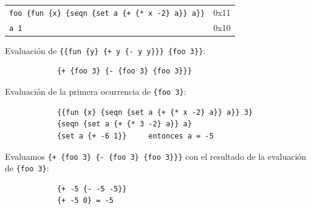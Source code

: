 \documentclass[letterpaper,11pt]{article}
\begin{document}
\begin{enumerate}
\begin{itemize}
\begin{center}
\begin{tabular}{|l| c }
                \texttt{foo \hspace{1cm} \{fun \{x\} \{seqn \{set a \{+ \{* x -2\} a\}\} a\}\}} & 0x11\\\cline{1-1}
                \texttt{a \hspace{1.4cm} 1} & 0x10\\\cline{1-1}
            \end{tabular}
        \end{center}
        Evaluación de \texttt{\{\{fun \{y\} \{+ y \{- y y\}\}\} \{foo 3\}\}}:
        \begin{verbatim}
            {+ {foo 3} {- {foo 3} {foo 3}}}
        \end{verbatim}
        Evaluación de la primera ocurrencia de \texttt{\{foo 3\}}:
        \begin{verbatim}
            {{fun {x} {seqn {set a {+ {* x -2} a}} a}} 3}
            {seqn {set a {+ {* 3 -2} a}} a}
            {set a {+ -6 1}}     entonces a = -5
        \end{verbatim}
        Evaluamos \texttt{\{+ \{foo 3\} \{- \{foo 3\} \{foo 3\}\}\}} con el resultado de la evaluación de \texttt{\{foo 3\}}:
        \begin{verbatim}
            {+ -5 {- -5 -5}}
            {+ -5 0} = -5
        \end{verbatim}
    \end{itemize}
    

\end{enumerate}
\end{document}
